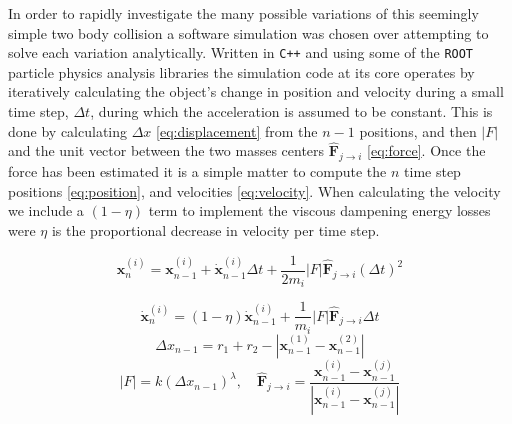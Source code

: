 \documentclass[aps,prl,floatfix,preprint,nofootinbib]{revtex4}
\begin{document}
In order to rapidly investigate the many possible variations of this seemingly simple two body collision a software simulation was chosen over attempting to solve each variation analytically. Written in \texttt{C++} and using some of the \texttt{ROOT}~\cite{ref_root} particle physics analysis libraries the simulation code at its core operates by iteratively calculating the object's change in position and velocity during a small time step, $\Delta t$, during which the acceleration is assumed to be constant. This is done by calculating $\Delta x$ \eqref{eq:displacement} from the $n-1$ positions, and then $\left|F\right|$ and the unit vector between the two masses centers $\mathbf{\hat{F}}_{j\rightarrow i}$ \eqref{eq:force}. Once the force has been estimated it is a simple matter to compute the $n$ time step positions \eqref{eq:position}, and velocities \eqref{eq:velocity}. When calculating the velocity we include a $\left(1-\eta\right)$ term to implement the viscous dampening energy losses were $\eta$ is the proportional decrease in velocity per time step.

\begin{equation}\label{eq:position}
  \mathbf{x}^{(i)}_{n} = \mathbf{x}^{(i)}_{n-1} + \dot{\mathbf{x}}^{(i)}_{n-1} \Delta t + \frac{1}{2m_i} \left| F \right| \mathbf{\hat{F}}_{j\rightarrow i} \left(\Delta t\right)^2
\end{equation}

\begin{equation}\label{eq:velocity}
  \dot{\mathbf{x}}^{(i)}_{n} = (1-\eta)\dot{\mathbf{x}}^{(i)}_{n-1} + \frac{1}{m_i} \left| F \right| \mathbf{\hat{F}}_{j\rightarrow i} \Delta t
\end{equation}
\begin{equation}\label{eq:displacement}
  \Delta x_{n-1} = r_1 + r_2 - \left| \mathbf{x}^{(1)}_{n-1}-\mathbf{x}^{(2)}_{n-1} \right|
\end{equation}
\begin{equation}\label{eq:force}
  \left| F \right| = k \left(\Delta x_{n-1}\right)^{\lambda},\quad \mathbf{\hat{F}}_{j\rightarrow i} = \frac{\mathbf{x}^{(i)}_{n-1}-\mathbf{x}^{(j)}_{n-1}}{\left|\mathbf{x}^{(i)}_{n-1}-\mathbf{x}^{(j)}_{n-1}\right|}
\end{equation}
\end{document}
